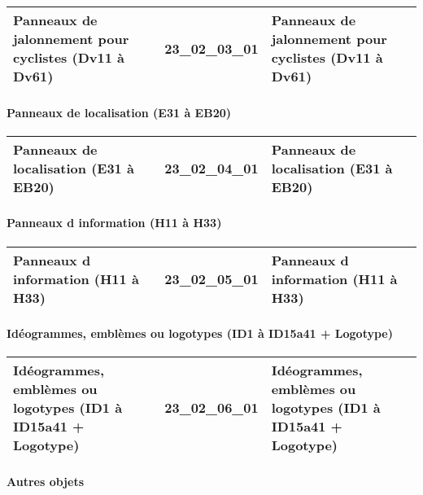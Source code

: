 \documentclass[12pt,titlepage,oneside]{book}
\begin{document}
\renewcommand{\arraystretch}{1.2}
\begin{supertabular}{|p{10cm}|c|p{15cm}|}
 Panneaux de jalonnement pour cyclistes (Dv11 à Dv61) & 23\_02\_03\_01 & Panneaux de jalonnement pour cyclistes (Dv11 à Dv61)\\
\hline
\end{supertabular}


\paragraph{Panneaux de localisation (E31 à EB20)}
\noindent
\vspace{\baselineskip}

\renewcommand{\arraystretch}{1.2}
\begin{supertabular}{|p{10cm}|c|p{15cm}|}
 Panneaux de localisation (E31 à EB20) & 23\_02\_04\_01 & Panneaux de localisation (E31 à EB20)\\
\hline
\end{supertabular}


\paragraph{Panneaux d information (H11 à H33)}
\noindent
\vspace{\baselineskip}

\renewcommand{\arraystretch}{1.2}
\begin{supertabular}{|p{10cm}|c|p{15cm}|}
 Panneaux d information (H11 à H33) & 23\_02\_05\_01 & Panneaux d information (H11 à H33)\\
\hline
\end{supertabular}


\paragraph{Idéogrammes, emblèmes ou logotypes (ID1 à ID15a41 + Logotype)}
\noindent
\vspace{\baselineskip}

\renewcommand{\arraystretch}{1.2}
\begin{supertabular}{|p{10cm}|c|p{15cm}|}
 Idéogrammes, emblèmes ou logotypes (ID1 à ID15a41 + Logotype) & 23\_02\_06\_01 & Idéogrammes, emblèmes ou logotypes (ID1 à ID15a41 + Logotype)\\
\hline
\end{supertabular}


\paragraph{Autres objets}
\noindent
\vspace{\baselineskip}
\end{document}
